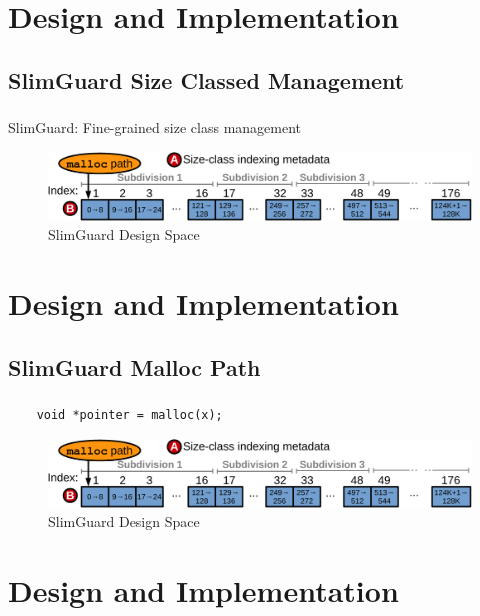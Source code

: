 \documentclass{beamer}
\begin{document}
\section{Design and Implementation}
\subsection{SlimGuard Size Classed Management}
\begin{frame}
	\frametitle{\secname}
    \framesubtitle{\subsecname}
    SlimGuard: Fine-grained size class management
    \begin{figure}
      \centering
      \includegraphics[scale=0.4]{overview1.pdf}
      \\ SlimGuard Design Space
    \end{figure}
\end{frame}

\section{Design and Implementation}
\subsection{SlimGuard Malloc Path}
\begin{frame}[fragile]
		\frametitle{\secname}
    \framesubtitle{\subsecname}
    \begin{verbatim}
    void *pointer = malloc(x);
    \end{verbatim}
    \begin{figure}
      \centering
      \includegraphics[scale=0.4]{overview1.pdf}
      \\ SlimGuard Design Space
    \end{figure}
\end{frame}

\section{Design and Implementation}
\end{document}
